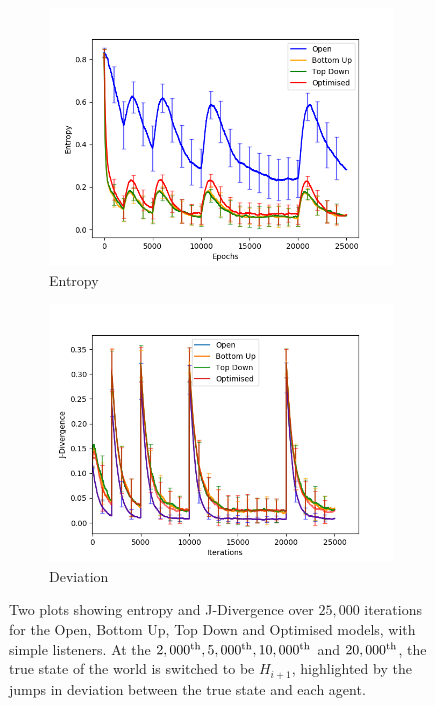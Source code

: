 \begin{figure}[H]
 \centering
  \begin{subfigure}[ht]{0.45\textwidth}
    \includegraphics[width=\textwidth]{Images/Figures/Evidence/EntropyGood.png}
    \caption{Entropy}
 \end{subfigure}
 \hfill
 \begin{subfigure}[ht]{0.45\textwidth}
    \includegraphics[width=\textwidth]{Images/Figures/Evidence/J-DivGood.png}
    \caption{Deviation} \label{fig:evidence_deviation}
 \end{subfigure}
 \caption{Two plots showing entropy and J-Divergence over $25,000$ iterations for the Open, Bottom Up, Top Down and Optimised models, with simple listeners. At the $2,000^{\textnormal{th}},5,000^{\textnormal{th}},10,000^{\textnormal{th}} $ and $ 20,000^{\textnormal{th}} $, the true state of the world is switched to be $H_{i+1}$, highlighted by the jumps in deviation between the true state and each agent.}\label{fig:evidence}
\end{figure}

